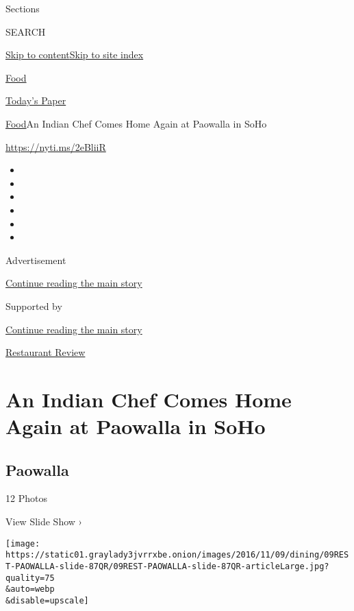 Sections

SEARCH

\protect\hyperlink{site-content}{Skip to
content}\protect\hyperlink{site-index}{Skip to site index}

\href{https://www.nytimes3xbfgragh.onion/section/food}{Food}

\href{https://myaccount.nytimes3xbfgragh.onion/auth/login?response_type=cookie\&client_id=vi}{}

\href{https://www.nytimes3xbfgragh.onion/section/todayspaper}{Today's
Paper}

\href{/section/food}{Food}\textbar{}An Indian Chef Comes Home Again at
Paowalla in SoHo

\url{https://nyti.ms/2eBliiR}

\begin{itemize}
\item
\item
\item
\item
\item
\item
\end{itemize}

Advertisement

\protect\hyperlink{after-top}{Continue reading the main story}

Supported by

\protect\hyperlink{after-sponsor}{Continue reading the main story}

\href{/column/restaurant-review}{Restaurant Review}

\hypertarget{an-indian-chef-comes-home-again-at-paowalla-in-soho}{%
\section{An Indian Chef Comes Home Again at Paowalla in
SoHo}\label{an-indian-chef-comes-home-again-at-paowalla-in-soho}}

\href{https://www.nytimes3xbfgragh.onion/slideshow/2016/11/09/dining/paowalla-restaurant-floyd-cardoz.html}{}

\hypertarget{paowalla}{%
\subsection{Paowalla}\label{paowalla}}

12 Photos

View Slide Show ›

\texttt{[image: https://static01.graylady3jvrrxbe.onion/images/2016/11/09/dining/09REST-PAOWALLA-slide-87QR/09REST-PAOWALLA-slide-87QR-articleLarge.jpg?quality=75\\\&auto=webp\\\&disable=upscale]}

